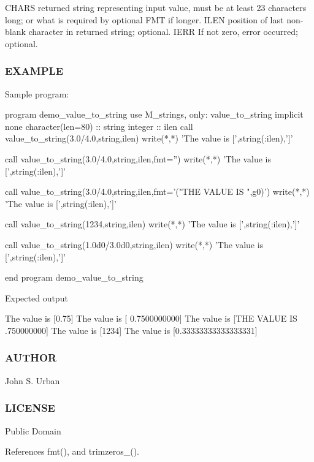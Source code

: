 C\+H\+A\+RS returned string representing input value, must be at least 23 characters long; or what is required by optional F\+MT if longer. I\+L\+EN position of last non-\/blank character in returned string; optional. I\+E\+RR If not zero, error occurred; optional. \subsubsection*{E\+X\+A\+M\+P\+LE}

Sample program\+: \begin{DoxyVerb}program demo_value_to_string
use M_strings, only: value_to_string
implicit none
character(len=80) :: string
integer           :: ilen
   call value_to_string(3.0/4.0,string,ilen)
   write(*,*) 'The value is [',string(:ilen),']'

   call value_to_string(3.0/4.0,string,ilen,fmt='')
   write(*,*) 'The value is [',string(:ilen),']'

   call value_to_string(3.0/4.0,string,ilen,fmt='("THE VALUE IS ",g0)')
   write(*,*) 'The value is [',string(:ilen),']'

   call value_to_string(1234,string,ilen)
   write(*,*) 'The value is [',string(:ilen),']'

   call value_to_string(1.0d0/3.0d0,string,ilen)
   write(*,*) 'The value is [',string(:ilen),']'

end program demo_value_to_string
\end{DoxyVerb}


Expected output \begin{DoxyVerb}The value is [0.75]
The value is [      0.7500000000]
The value is [THE VALUE IS .750000000]
The value is [1234]
The value is [0.33333333333333331]
\end{DoxyVerb}


\subsubsection*{A\+U\+T\+H\+OR}

John S. Urban \subsubsection*{L\+I\+C\+E\+N\+SE}

Public Domain 

References fmt(), and trimzeros\+\_\+().

